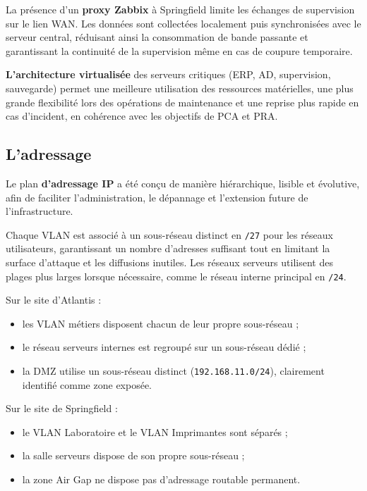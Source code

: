\vspace{0.5cm}

\noindent La présence d’un \textbf{proxy Zabbix} à Springfield limite les échanges de supervision sur le lien WAN. Les données sont collectées localement puis synchronisées avec le serveur central, réduisant ainsi la consommation de bande passante et garantissant la continuité de la supervision même en cas de coupure temporaire.
\vspace{0.5cm}

\noindent \textbf{L’architecture virtualisée} des serveurs critiques (ERP, AD, supervision, sauvegarde) permet une meilleure utilisation des ressources matérielles, une plus grande flexibilité lors des opérations de maintenance et une reprise plus rapide en cas d’incident, en cohérence avec les objectifs de PCA et PRA.

\subsection*{L’adressage}
{}

Le plan \textbf{d’adressage IP} a été conçu de manière hiérarchique, lisible et évolutive, afin de faciliter l’administration, le dépannage et l’extension future de l’infrastructure.

\noindent Chaque VLAN est associé à un sous-réseau distinct en \texttt{/27} pour les réseaux utilisateurs, garantissant un nombre d’adresses suffisant tout en limitant la surface d’attaque et les diffusions inutiles. Les réseaux serveurs utilisent des plages plus larges lorsque nécessaire, comme le réseau interne principal en \texttt{/24}.

\newpage

\noindent Sur le site d’Atlantis :
\begin{itemize}
    \item les VLAN métiers disposent chacun de leur propre sous-réseau ;
    \item le réseau serveurs internes est regroupé sur un sous-réseau dédié ;
    \item la DMZ utilise un sous-réseau distinct (\texttt{192.168.11.0/24}), clairement identifié comme zone exposée.
\end{itemize}

\vspace{0.5cm}

\noindent Sur le site de Springfield :
\begin{itemize}
    \item le VLAN Laboratoire et le VLAN Imprimantes sont séparés ;
    \item la salle serveurs dispose de son propre sous-réseau ;
    \item la zone Air Gap ne dispose pas d’adressage routable permanent.
\end{itemize}

